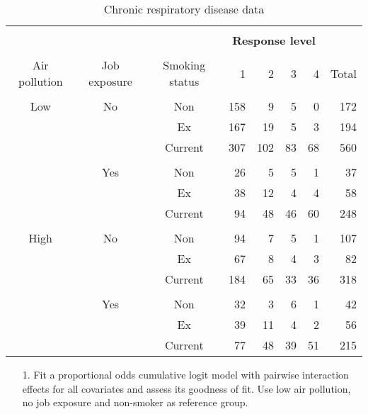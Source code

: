 \documentclass[]{article}
\begin{document}
\begin{table}[h]
\begin{center}
\begin{tabular}{cccrrrrr} \hline
\\[-.9 em]
 &  &  &  \multicolumn{4}{c}{\bf Response level}  & \\[.2em] \cline{4-7}
 \\[-.9 em]
 Air pollution & Job exposure & Smoking status & 1 & 2 & 3 & 4 & Total \\[.2em] \hline 
 \\[-.9 em]
Low & No & Non & 158 & 9 & 5 & 0 & 172\\[.2em]
  &  &  Ex & 167 & 19 & 5 & 3 & 194 \\[.2em] 
  &  &  Current & 307 & 102 & 83 & 68 & 560 \\[.2em] \cline{3-8}
  \\[-.9 em]
  &  Yes & Non & 26 & 5 & 5 & 1 & 37 \\[.2em]
   &  & Ex & 38 & 12 & 4 & 4 & 58 \\[.2em]
   &  &  Current &  94 & 48 & 46  & 60 & 248 \\[.2em] \hline
   \\[-.8 em]
High & No & Non & 94 & 7 & 5 & 1 & 107 \\[.2em]
  &  &  Ex & 67 & 8 & 4 & 3 & 82 \\[.2em] 
  & & Current &  184 & 65  & 33 & 36 & 318 \\[.2em] \cline{3-8}
  \\[-.9 em]
  & Yes & Non & 32 & 3 & 6 & 1 & 42 \\[.2em]
   &  & Ex & 39 & 11 & 4 & 2 & 56 \\[.2em] 
   &  &  Current & 77 & 48 & 39 & 51 & 215 \\[.2em] \hline
  \end{tabular}
  \caption{Chronic respiratory disease data} \label{table:ex1}
  \end{center}
  \end{table}

\vspace*{3mm}

\begin{itemize}
\item[1.] Fit a proportional odds cumulative logit model with pairwise interaction effects for all covariates and assess its goodness of fit. Use low air pollution, no job exposure and non-smoker as reference group.
\end{itemize}
\end{document}
